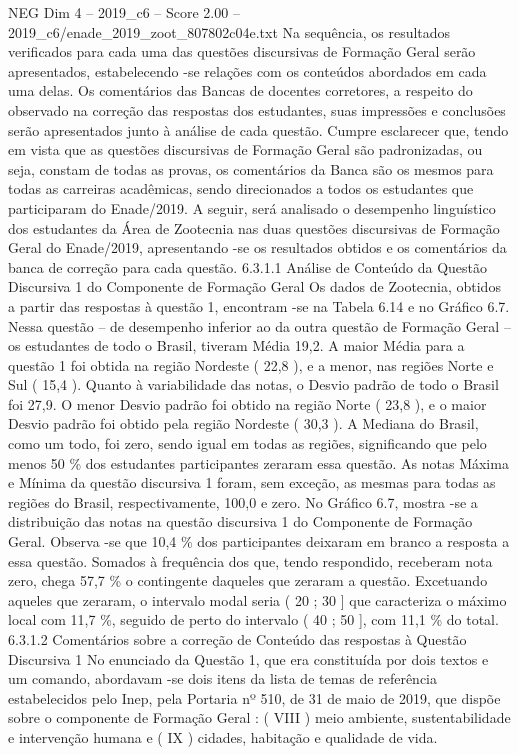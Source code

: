 \begin{textsample}{NEG Dim 4 – 2019\_c6 – Score 2.00 – 2019\_c6/enade\_2019\_zoot\_807802c04e.txt}
Na sequência, os resultados verificados para cada uma das questões discursivas de Formação Geral serão apresentados, estabelecendo -se relações com os conteúdos abordados em cada uma delas.
Os comentários das Bancas de docentes corretores, a respeito do observado na correção das respostas dos estudantes, suas impressões e conclusões serão apresentados junto à análise de cada questão.
Cumpre esclarecer que, tendo em vista que as questões discursivas de Formação Geral são padronizadas, ou seja, constam de todas as provas, os comentários da Banca são os mesmos para todas as carreiras acadêmicas, sendo direcionados a todos os estudantes que participaram do Enade/2019.
A seguir, será analisado o desempenho linguístico dos estudantes da Área de Zootecnia nas duas questões discursivas de Formação Geral do Enade/2019, apresentando -se os resultados obtidos e os comentários da banca de correção para cada questão. 6.3.1.1 Análise de Conteúdo da Questão Discursiva 1 do Componente de Formação Geral Os dados de Zootecnia, obtidos a partir das respostas à questão 1, encontram -se na Tabela 6.14 e no Gráfico 6.7.
Nessa questão – de desempenho inferior ao da outra questão de Formação Geral – os estudantes de todo o Brasil, tiveram Média 19,2.
A maior Média para a questão 1 foi obtida na região Nordeste ( 22,8 ), e a menor, nas regiões Norte e Sul ( 15,4 ).
Quanto à variabilidade das notas, o Desvio padrão de todo o Brasil foi 27,9.
O menor Desvio padrão foi obtido na região Norte ( 23,8 ), e o maior Desvio padrão foi obtido pela região Nordeste ( 30,3 ).
A Mediana do Brasil, como um todo, foi zero, sendo igual em todas as regiões, significando que pelo menos 50 \% dos estudantes participantes zeraram essa questão.
As notas Máxima e Mínima da questão discursiva 1 foram, sem exceção, as mesmas para todas as regiões do Brasil, respectivamente, 100,0 e zero.
No Gráfico 6.7, mostra -se a distribuição das notas na questão discursiva 1 do Componente de Formação Geral.
Observa -se que 10,4 \% dos participantes deixaram em branco a resposta a essa questão.
Somados à frequência dos que, tendo respondido, receberam nota zero, chega 57,7 \% o contingente daqueles que zeraram a questão.
Excetuando aqueles que zeraram, o intervalo modal seria ( 20 ; 30 ] que caracteriza o máximo local com 11,7 \%, seguido de perto do intervalo ( 40 ; 50 ], com 11,1 \% do total. 6.3.1.2 Comentários sobre a correção de Conteúdo das respostas à Questão Discursiva 1 No enunciado da Questão 1, que era constituída por dois textos e um comando, abordavam -se dois itens da lista de temas de referência estabelecidos pelo Inep, pela Portaria nº 510, de 31 de maio de 2019, que dispõe sobre o componente de Formação Geral : ( VIII ) meio ambiente, sustentabilidade e intervenção humana e ( IX ) cidades, habitação e qualidade de vida.

\end{textsample}
